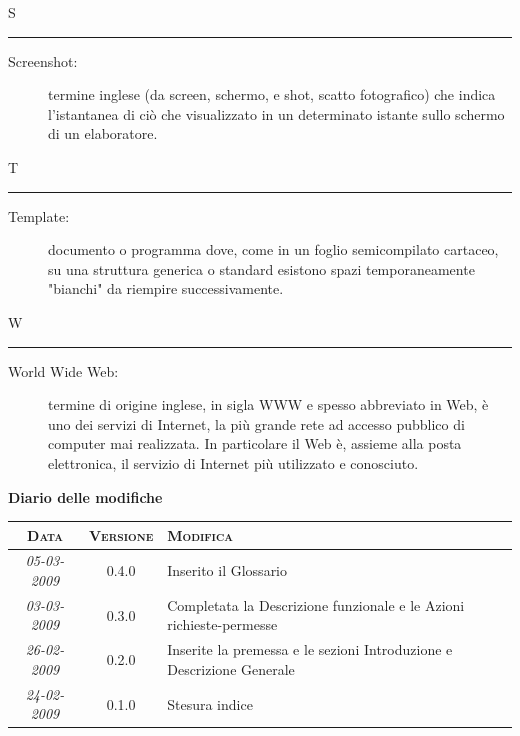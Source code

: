 \documentclass[11pt,a4paper]{article}
\newcommand{\modifiche} 
{
\newpage
\begin{center}
\textbf{Diario delle modifiche} \\
\bigskip
\begin{tabular}{|c|c|p{0.62\textwidth}|}
\hline
\textsc{Data} & \textsc{Versione} & \textsc{Modifica} \\
\hline
\hline
\textit{05-03-2009} & 0.4.0 & Inserito il Glossario\\
\hline
\textit{03-03-2009} & 0.3.0 & Completata la Descrizione funzionale e le Azioni richieste-permesse\\
\hline
\textit{26-02-2009} & 0.2.0 & Inserite la premessa e le sezioni Introduzione e Descrizione Generale\\
\hline
\textit{24-02-2009} & 0.1.0 & Stesura indice\\
\hline
\end{tabular}
\end{center}
}
\begin{document}
\bigskip
\Huge S \bigskip
\hrule
\smallskip
\normalsize
\begin{description}
	\item[Screenshot:] termine inglese (da screen, schermo, e shot, scatto fotografico) che indica l'istantanea di ciò che visualizzato in un determinato istante sullo schermo di un elaboratore.
\end{description}
\bigskip
\Huge T \bigskip
\hrule
\smallskip
\normalsize
\begin{description}
	\item[Template:] documento o programma dove, come in un foglio semicompilato cartaceo, su una struttura generica o standard esistono spazi temporaneamente "bianchi" da riempire successivamente.
\end{description}
\bigskip
\Huge W \bigskip
\hrule
\smallskip
\normalsize
\begin{description}
	\item[World Wide Web:] termine di origine inglese, in sigla WWW e spesso abbreviato in Web, è uno dei servizi di Internet, la più grande rete ad accesso pubblico di computer mai realizzata. In particolare il Web è, assieme alla posta elettronica, il servizio di Internet più utilizzato e conosciuto.
\end{description}
\modifiche
\end{document}
